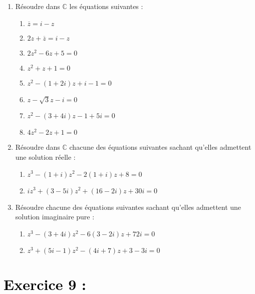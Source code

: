 \documentclass[12pt]{article}
\begin{document}
\begin{enumerate}
    \item Résoudre dans $\mathbb{C}$ les équations suivantes :
    \begin{enumerate}
        \item $\overline{z} = i - z$
        \item $2z + \overline{z} = i - z$
        \item $2z^2 - 6z + 5 = 0$
        \item $z^2 + z + 1 = 0$
        \item $z^2 - (1 + 2i)z + i - 1 = 0$
        \item $z - \sqrt{3}z - i = 0$
        \item $z^2 - (3 + 4i)z - 1 + 5i = 0$
        \item $4z^2 - 2z + 1 = 0$
    \end{enumerate}

    \item Résoudre dans $\mathbb{C}$ chacune des équations suivantes sachant qu’elles admettent une solution réelle :
    \begin{enumerate}
        \item $z^3 - (1 + i)z^2 - 2(1 + i)z + 8 = 0$
        \item $iz^3 + (3 - 5i)z^2 + (16 - 2i)z + 30i = 0$
    \end{enumerate}

    \item Résoudre chacune des équations suivantes sachant qu’elles admettent une solution imaginaire pure :
    \begin{enumerate}
        \item $z^3 - (3 + 4i)z^2 - 6(3 - 2i)z + 72i = 0$
        \item $z^3 + (5i - 1)z^2 - (4i + 7)z + 3 - 3i = 0$
    \end{enumerate}
\end{enumerate}

\section*{\textcolor{black}{Exercice 9 :}}
\end{document}
